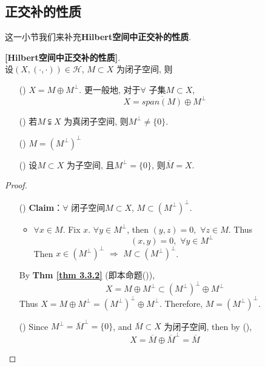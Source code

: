 \newpage

\subsection{正交补的性质}
	这一小节我们来补充\textbf{Hilbert空间中正交补的性质}. 
	
	\vspace{1em}
	
	\begin{proposition}\label{prop 3.3.2}
		\textbf{[Hilbert空间中正交补的性质]}. \\
		设$(X , (\cdot , \cdot)) \in \mathcal{H}$, $M \subset X$ 为闭子空间, 则
		
		\vspace{1em}
		
		\begin{enumerate}
			\item[(\rmnum{1})] $X = M \oplus M^{\perp}$. 更一般地, 对于$\forall$ 子集$M \subset X$, 
			\[ X = \overline{span(M)} \oplus M^{\perp} \]
			
			\item[(\rmnum{2})] 若$M \subsetneqq X$ 为真闭子空间, 则$M^{\perp} \neq \{ 0 \}$. 
			
			\item[(\rmnum{3})] $M = \left( M^{\perp} \right)^{\perp}$ 
			
			\item[(\rmnum{4})] 设$M \subset X$ 为子空间, 且$M^{\perp} = \{ 0 \}$, 则$\overline{M} = X$. 
		\end{enumerate}
		
		\vspace{6em}
		
		\begin{proof}
			\begin{enumerate}
				\item[(\rmnum{3})] \textbf{Claim}：$\forall$ 闭子空间$M \subset X$, $M \subset \left( M^{\perp} \right)^{\perp}$. 
				\begin{itemize}
					\item $\forall x \in M$. Fix $x$. $\forall y \in M^{\perp}$, then $(y , z) = 0 , \,\, \forall z \in M$. Thus
					\[ (x , y) = 0 , \,\, \forall y \in M^{\perp} \]
					Then $x \in \left( M^{\perp} \right)^{\perp} \,\, \Rightarrow \,\, M \subset \left( M^{\perp} \right)^{\perp}$. 
				\end{itemize}
				By \textbf{Thm \ref{thm 3.3.2}} (即本命题()), 
				\[ X = M \oplus M^{\perp} \subset \left( M^{\perp} \right)^{\perp} \oplus M^{\perp} \]
				Thus $X = M \oplus M^{\perp} = \left( M^{\perp} \right)^{\perp} \oplus M^{\perp}$. Therefore, $M = \left( M^{\perp} \right)^{\perp}$. 
				
				\vspace{5em}
				
				\item[(\rmnum{4})] Since $M^{\perp} = \overline{M}^{\perp} = \{ 0 \}$, and $\overline{M} \subset X$ 为闭子空间, then by (), 
				\[ X = \overline{M} \oplus \overline{M}^{\perp} = \overline{M} \]
			\end{enumerate}
		\end{proof}
	\end{proposition}

